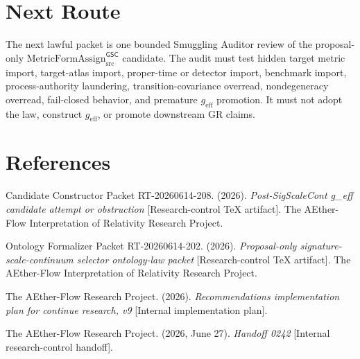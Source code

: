 \documentclass[11pt]{article}
\newcommand{\geff}{g_{\mathrm{eff}}}
\newcommand{\MetricFormAssign}{\mathrm{MetricFormAssign}_{\mathrm{src}}^{\mathsf{GSC}}}
\begin{document}
\section{Next Route}

The next lawful packet is one bounded Smuggling Auditor review of the
proposal-only \(\MetricFormAssign\) candidate. The audit must test hidden
target metric import, target-atlas import, proper-time or detector import,
benchmark import, process-authority laundering, transition-covariance
overread, nondegeneracy overread, fail-closed behavior, and premature
\(\geff\) promotion. It must not adopt the law, construct \(\geff\), or
promote downstream GR claims.

\section*{References}

Candidate Constructor Packet RT-20260614-208. (2026).
\textit{Post-SigScaleCont g\_eff candidate attempt or obstruction}
[Research-control TeX artifact]. The AEther-Flow Interpretation of Relativity
Research Project.

Ontology Formalizer Packet RT-20260614-202. (2026).
\textit{Proposal-only signature-scale-continuum selector ontology-law packet}
[Research-control TeX artifact]. The AEther-Flow Interpretation of Relativity
Research Project.

The AEther-Flow Research Project. (2026). \textit{Recommendations
implementation plan for continue research, v9} [Internal implementation plan].

The AEther-Flow Research Project. (2026, June 27). \textit{Handoff 0242}
[Internal research-control handoff].
\end{document}
